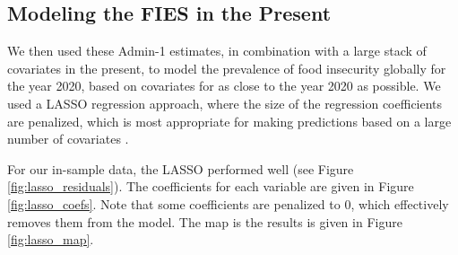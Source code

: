\documentclass{article}
\begin{document}
\subsection{Modeling the FIES in the Present}
We then used these Admin-1 estimates, in combination with a large stack of covariates in the present, to model the prevalence of food insecurity globally for the year 2020, based on covariates for as close to the year 2020 as possible.  We used a LASSO regression approach, where the size of the regression coefficients are penalized, which is most appropriate for making predictions based on a large number of covariates \cite{Tibshirani2011}.

For our in-sample data, the LASSO performed well (see Figure \ref{fig:lasso_residuals}).  The coefficients for each variable are given in Figure \ref{fig:lasso_coefs}.  Note that some coefficients are penalized to 0, which effectively removes them from the model.  The map is the results is given in Figure \ref{fig:lasso_map}.
\end{document}
